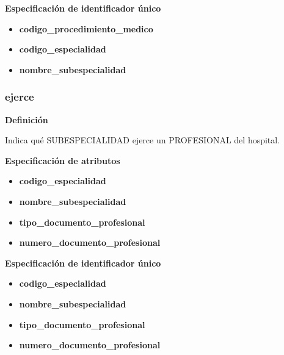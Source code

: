 \documentclass[a4paper,11pt]{article}
\begin{document}
\textbf{Especificación de identificador único}

\begin{itemize}

     \item \textbf{codigo\_procedimiento\_medico}

     \item \textbf{codigo\_especialidad}

     \item \textbf{nombre\_subespecialidad}

\end{itemize}

\subsubsection{\textbf{ejerce}}

\textbf{Definición}

Indica qué SUBESPECIALIDAD ejerce un PROFESIONAL del hospital.

\textbf{Especificación de atributos}


\begin{itemize}

     \item \textbf{codigo\_especialidad}

     \item \textbf{nombre\_subespecialidad}

     \item \textbf{tipo\_documento\_profesional}

     \item \textbf{numero\_documento\_profesional}

\end{itemize}

\textbf{Especificación de identificador único}

\begin{itemize}

    \item \textbf{codigo\_especialidad}

     \item \textbf{nombre\_subespecialidad}

     \item \textbf{tipo\_documento\_profesional}

     \item \textbf{numero\_documento\_profesional}

\end{itemize}
\end{document}
